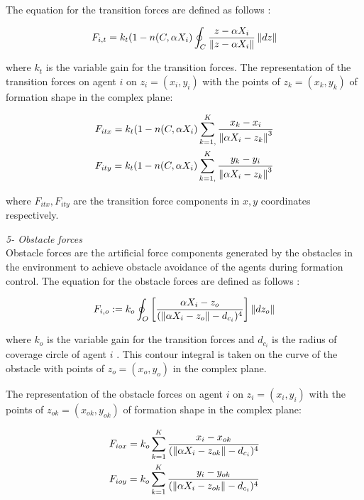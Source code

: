 The equation for the transition forces are defined as follows \cite{17}:	
				
\begin{equation}
F_{i,t} = k_t (1-n(C,\alpha X_i) \oint_C \frac{z-\alpha X_i}{\left\lVert z-\alpha X_i\right\rVert}\left\lVert dz\right\rVert
\end{equation}
				
where $k_t$ is the variable gain for the transition forces. The representation of the transition forces on agent $i$ on $z_i = (x_i, y_i)$ with the points of  $z_k = (x_k,y_k)$ of formation shape in the complex plane:
			
\begin{align}
\begin{split}
&F_{itx} = k_t  (1-n(C,\alpha X_i) \sum_{k=1,}^{K}\frac{x_k- x_i}{\left\lVert\alpha X_i - z_k\right\rVert^3}\\
&F_{ity} = k_t  (1-n(C,\alpha X_i) \sum_{k=1,}^{K}\frac{y_k- y_i}{\left\lVert\alpha X_i - z_k\right\rVert^3}\\
\end{split}
\end{align}
			
where  $F_{itx} , F_{ity} $ are the transition force components in $x,y$ coordinates respectively. \newline
			
\textit{			5- Obstacle forces} \\ 
Obstacle forces are the artificial force components generated by the obstacles in the environment to achieve obstacle avoidance of the agents during formation control. 	
The equation for the obstacle forces are defined as follows \cite{17}:	
			
\begin{equation}
F_{i,o} := k_o  \oint_O \left[\frac{\alpha X_i - z_o}{(\left\lVert\alpha X_i - z_o\right\rVert - d_{c_i})^4}\right] \left\lVert dz_o\right\rVert
\end{equation}
			
where $k_o$ is the variable gain for the transition forces and $d_{c_i}$ is the radius of coverage circle of agent $i$ . This contour integral is taken on the curve of the obstacle with  points of $z_o = (x_o,y_o)$ in the complex plane.
			
The representation of the obstacle forces on agent $i$ on $z_i = (x_i, y_i)$ with the points of  $z_{ok} = (x_{ok},y_{ok})$ of formation shape in the complex plane:
			
\begin{align}
\begin{split}
& F_{iox} = k_o   \sum_{k=1}^{K} \frac{x_i -x_{ok}}{(\left\lVert\alpha X_i - z_{ok}\right\rVert -d_{c_i})^4}\\
& F_{ioy} = k_o   \sum_{k=1}^{K} \frac{y_i - y_{ok}}{(\left\lVert\alpha X_i - z_{ok}\right\rVert -d_{c_i})^4}\\
\end{split}
\end{align}
			
